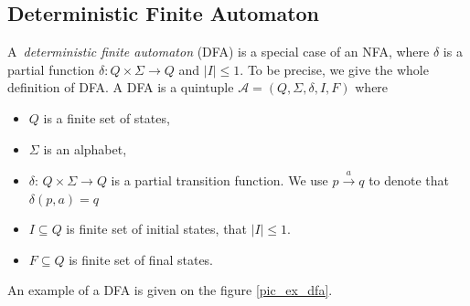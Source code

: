 	\subsection{Deterministic Finite Automaton}
	\label{defDFA}
  A~\emph{deterministic finite automaton} (DFA) is a special case of an NFA, where $\delta$ is a partial function 
$\delta: Q\times \Sigma \to Q$ and $|I| \leq 1$. To be precise, we give the whole definition of DFA.\newline
\newline
		A DFA is a quintuple $\mathcal{A}=(Q,\Sigma,\delta,I,F)$ where
		\begin{itemize}
			\item $Q$ is a finite set of states,
			\item $\Sigma$ is  an alphabet,
			\item $\delta$:  $Q \times \Sigma \to Q$ is a partial transition function. We use $p \xrightarrow{a} q$ to denote that $\delta(p,a)=q$
			\item $I\subseteq Q$ is finite set of initial states, that $|I| \leq 1$.
			\item $F\subseteq Q$ is finite set of final states.
		\end{itemize}
    An example of a DFA is given on the figure \ref{pic_ex_dfa}.



